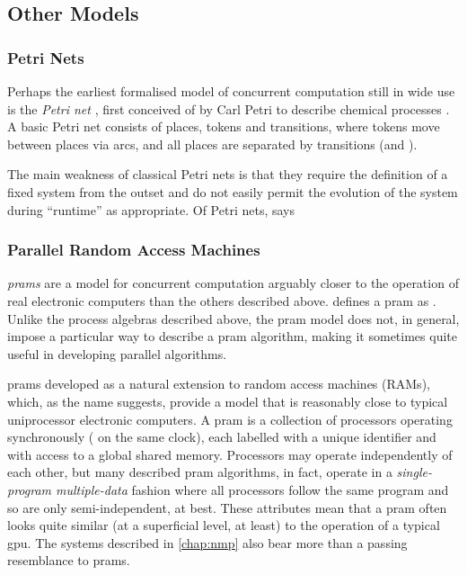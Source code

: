 \subsection{\label{sec:back:othermodels}Other Models}

\subsubsection{Petri Nets}
Perhaps the earliest formalised model of concurrent computation still in wide use is the \emph{Petri net} \cite{Dennis2011}, first conceived of by Carl Petri to describe chemical processes \cite{Petri2008}.  A basic Petri net consists of places, tokens and transitions, where tokens move between places via arcs, and all places are separated by transitions (and \viceversa).

The main weakness of classical Petri nets is that they require the definition of a fixed system from the outset and do not easily permit the evolution of the system during ``runtime'' as appropriate.  Of Petri nets, \citeauthor{Varela2013} says 

\subsubsection{\label{sec:back:pram}Parallel Random Access Machines}

\emph{\Glspl{pram}} are a model for concurrent computation arguably closer to the operation of real electronic computers than the others described above.  \citeauthor{JaJa2011} defines a \gls{pram} as .  Unlike the process algebras described above, the \gls{pram} model does not, in general, impose a particular way to describe a \gls{pram} algorithm, making it sometimes quite useful in developing parallel algorithms.

\Glspl{pram} developed as a natural extension to random access machines (RAMs), which, as the name suggests, provide a model that is reasonably close to typical uniprocessor electronic computers.  A \gls{pram} is a collection of processors operating synchronously (\ie{} on the same clock), each labelled with a unique identifier and with access to a global shared memory.  Processors may operate independently of each other, but many described \gls{pram} algorithms, in fact, operate in a \emph{single-program multiple-data} fashion where all processors follow the same program and so are only semi-independent, at best.  These attributes mean that a \gls{pram} often looks quite similar (at a superficial level, at least) to the operation of a typical \gls{gpu}.  The systems described in \cref{chap:nmp} also bear more than a passing resemblance to \glspl{pram}.